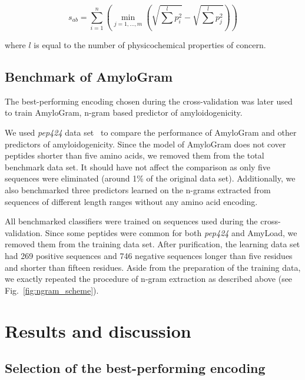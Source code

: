 \documentclass[a4,center,fleqn]{NAR}
\begin{document}
$$
s_{ab} = \sum^n_{i = 1}  \left( \min_{j=1,\dots,m} \left(\sqrt{\sum^l p_{i}^2} 
- \sqrt{\sum^l p_{j}^2} \right) \right)
$$
 
where $l$ is equal to the number of physicochemical properties of concern.

\subsection{Benchmark of AmyloGram}

The best-performing encoding chosen during the 
cross-validation was later used to train AmyloGram, n-gram based predictor of 
amyloidogenicity.

  We used \textit{pep424} data set~\citep{walsh_pasta_2014} to compare the 
performance of AmyloGram and other predictors of amyloidogenicity. Since the 
model of AmyloGram does not cover peptides shorter than five amino acids, we 
removed them from the total benchmark data set. It should have not affect the 
comparison as only five sequences were eliminated (around 1\% of the original 
data set). Additionally, we also benchmarked three predictors learned on the 
n-grams extracted from sequences of different length ranges without any amino 
acid encoding.

  All benchmarked classifiers were trained on sequences used during the 
cross-validation. Since some peptides were common for both \textit{pep424} and 
AmyLoad, we removed them from the training data set. After purification, the 
learning data set had 269 positive sequences and 746 negative sequences longer 
than five residues and shorter than fifteen residues. Aside from the 
preparation of the training data, we exactly repeated the procedure of n-gram 
extraction as described above (see Fig.~\ref{fig:ngram_scheme}). 


\section{Results and discussion}

\subsection{Selection of the best-performing encoding}
\end{document}
